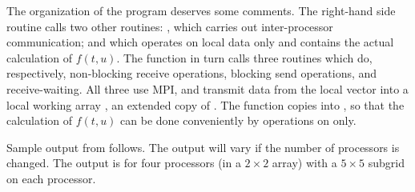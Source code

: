 The organization of the  program deserves some comments. The
right-hand side routine  calls two other routines: , which
carries out inter-processor communication; and  which operates on
local data only and contains the actual calculation of $f(t,u)$. The 
 function in turn calls three routines which do, respectively,
non-blocking receive operations, blocking send operations, and
receive-waiting. All three use MPI, and transmit data from the local 
vector into a local working array , an extended copy of .
The  function copies  into , so that the
calculation of $f(t,u)$ can be done conveniently by operations on 
 only.

Sample output from  follows. The output will vary if the
number of processors is changed. The output is for four processors 
(in a $2 \times 2$ array) with a $5 \times 5$ subgrid on each processor.
